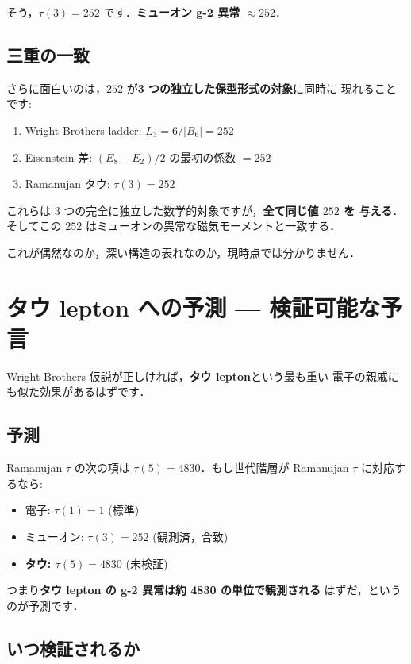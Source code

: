 \documentclass[11pt,a4paper]{article}
\begin{document}
そう，$\tau(3) = 252$ です．\textbf{ミューオン g-2 異常 $\approx 252$}．

\subsection{三重の一致}

さらに面白いのは，$252$ が\textbf{3 つの独立した保型形式の対象}に同時に
現れることです:
\begin{enumerate}
\item Wright Brothers ladder: $L_3 = 6/|B_6| = 252$
\item Eisenstein 差: $(E_8 - E_2)/2$ の最初の係数 $= 252$
\item Ramanujan タウ: $\tau(3) = 252$
\end{enumerate}

これらは 3 つの完全に独立した数学的対象ですが，\textbf{全て同じ値 $252$ を
与える}．そしてこの $252$ はミューオンの異常な磁気モーメントと一致する．

これが偶然なのか，深い構造の表れなのか，現時点では分かりません．

\section{タウ lepton への予測 --- 検証可能な予言}

Wright Brothers 仮説が正しければ，\textbf{タウ lepton}という最も重い
電子の親戚にも似た効果があるはずです．

\subsection{予測}

Ramanujan $\tau$ の次の項は $\tau(5) = 4830$．もし世代階層が
Ramanujan $\tau$ に対応するなら:
\begin{itemize}
\item 電子: $\tau(1) = 1$ (標準)
\item ミューオン: $\tau(3) = 252$ (観測済，合致)
\item \textbf{タウ: $\tau(5) = 4830$} (未検証)
\end{itemize}

つまり\textbf{タウ lepton の g-2 異常は約 4830 の単位で観測される}
はずだ，というのが予測です．

\subsection{いつ検証されるか}
\end{document}
